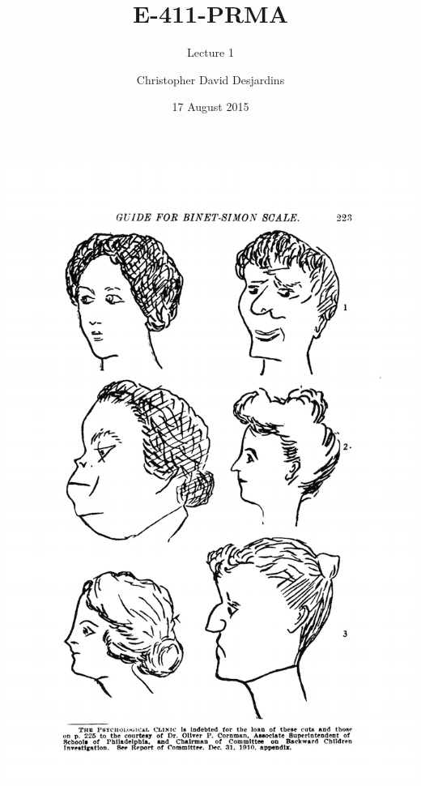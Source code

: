 \documentclass[dvipsnames]{beamer}\usepackage[]{graphicx}\usepackage[]{color}
\title{E-411-PRMA}
\subtitle{Lecture 1}
\author{Christopher David Desjardins}
\date{17 August 2015}
\begin{document}
\frame{\titlepage}


\begin{frame}
\centerline{\includegraphics[scale=.35]{images/binet2.png}}
\end{frame}
\end{document}
